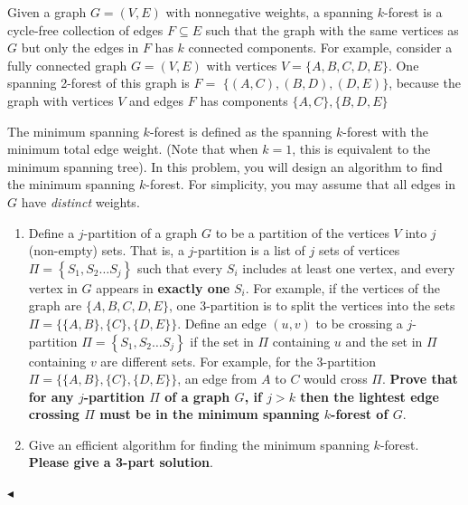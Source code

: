 \documentclass[11pt]{article}
\newenvironment{problem}[2][Problem]{\begin{trivlist}
\item[\hskip \labelsep{\bfseries#1}\hskip\labelsep{\bfseries#2.}]}{\hfill$\blacktriangleleft$\end{trivlist}}
\begin{document}
\begin{problem}{3 (Minimum Spanning $k$-Forest)}
    Given a graph $G=(V, E)$ with nonnegative weights, a spanning $k$-forest is a cycle-free collection of edges $F \subseteq E$ such that the graph with the same vertices as $G$ but only the edges in $F$ has $k$ connected components. For example, consider a fully connected graph $G=(V, E)$ with vertices $V=\{A, B, C, D, E\}$. One spanning 2-forest of this graph is $F=$ $\{(A, C),(B, D),(D, E)\}$, because the graph with vertices $V$ and edges $F$ has components $\{A, C\},\{B, D, E\}$

    The minimum spanning $k$-forest is defined as the spanning $k$-forest with the minimum total edge weight. (Note that when $k=1$, this is equivalent to the minimum spanning tree). In this problem, you will design an algorithm to find the minimum spanning $k$-forest. For simplicity, you may assume that all edges in $G$ have \textit{distinct} weights. 
    \begin{enumerate}[label=(\arabic*)]
        \item Define a $j$-partition of a graph $G$ to be a partition of the vertices $V$ into $j$ (non-empty) sets. That is, a $j$-partition is a list of $j$ sets of vertices $\Pi=\left\{S_{1}, S_{2} \ldots S_{j}\right\}$ such that every $S_{i}$ includes at least one vertex, and every vertex in $G$ appears in \textbf{exactly one} $S_{i}$. For example, if the vertices of the graph are $\{A, B, C, D, E\}$, one 3-partition is to split the vertices into the sets $\Pi=\{\{A, B\},\{C\},\{D, E\}\}$. Define an edge $(u, v)$ to be crossing a $j$-partition $\Pi=\left\{S_{1}, S_{2} \ldots S_{j}\right\}$ if the set in $\Pi$ containing $u$ and the set in $\Pi$ containing $v$ are different sets. For example, for the 3-partition $\Pi=\{\{A, B\},\{C\},\{D, E\}\}$, an edge from $A$ to $C$ would cross $\Pi$. \textbf{Prove that for any $j$-partition $\Pi$ of a graph $G$, if $j>k$ then the lightest edge crossing $\Pi$ must be in the minimum spanning $k$-forest of $G$}.
        \item Give an efficient algorithm for finding the minimum spanning $k$-forest. \textbf{Please give a 3-part solution}.
    \end{enumerate}
\end{problem}
\end{document}
